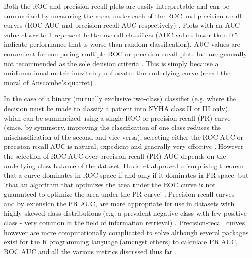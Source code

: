 \documentclass[]{article}
\begin{document}
Both the ROC and precision-recall plots are easily interpretable and can be summarized by measuring the areas under each of the ROC and precision-recall curves (ROC AUC and precision-recall AUC respectively) \cite{Davis2006,Flach2004,MedCalc2017,Sayad}. Plots with an AUC value closer to 1 represent better overall classifiers (AUC values lower than 0.5 indicate performance that is worse than random classification). AUC values are convenient for comparing multiple ROC or precision-recall plots but are generally not recommended as the sole decision criteria \cite{Davis2006,Flach2004,MedCalc2017,Sayad}. This is simply because a unidimensional metric inevitably obfuscates the underlying curve (recall the moral of Anscombe's quartet) \cite{Anscombe1973}.

In the case of a binary (mutually exclusive two-class) classifier (e.g. where the decision must be made to classify a patient into NYHA class II or III only), which can be summarized using a single ROC or precision-recall (PR) curve (since, by symmetry, improving the classification of one class reduces the misclassification of the second and vice versa), selecting either the ROC AUC or precision-recall AUC is natural, expedient and generally very effective \cite{Davis2006,Flach2004,MedCalc2017,Sayad}. However the selection of ROC AUC over precision-recall (PR) AUC depends on the underlying class balance of the dataset. David et al.\@ proved a 'surprising theorem that a curve dominates in ROC space if and only if it dominates in PR space' but 'that an algorithm that optimizes the area under the ROC curve is not guaranteed to optimize the area under the PR curve' \cite{Davis2006}. Precision-recall curves, and by extension the PR AUC, are more appropriate for use in datasets with highly skewed class distributions (e.g. a prevalent negative class with few positive class - very common in the field of information retrieval) \cite{Davis2006,Flach2004,Sokolova2009}. Precision-recall curves however are more computationally complicated to solve although several packages exist for the R programming language (amongst others) to calculate PR AUC, ROC AUC and all the various metrics discussed thus far \cite{Robin2017,Yan2016}.
\end{document}
